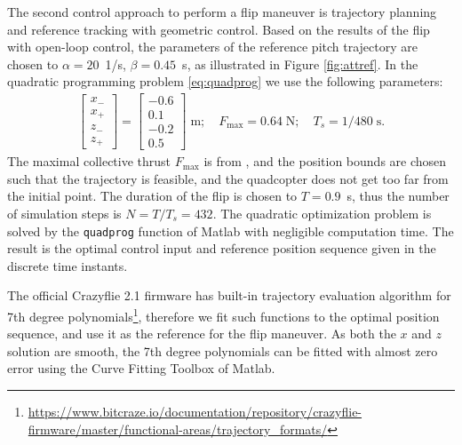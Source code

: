 The second control approach to perform a flip maneuver is trajectory planning and reference tracking with geometric control. Based on the results of the flip with open-loop control, the parameters of the reference pitch trajectory are chosen to $\alpha=20$~1/s, $\beta=0.45$~s, as illustrated in Figure \ref{fig:attref}. In the quadratic programming problem \eqref{eq:quadprog} we use the following parameters:
\begin{align*}
    \begin{bmatrix} x_- \\ x_+ \\ z_- \\ z_+ \end{bmatrix} =  \begin{bmatrix} -0.6 \\ 0.1 \\ -0.2 \\ 0.5 \end{bmatrix}\;\mathrm{m};\quad F_\mathrm{max} = 0.64\;\mathrm{N}; \quad T_s = 1/480\;\mathrm{s}.
\end{align*}
The maximal collective thrust $F_\mathrm{max}$ is from \cite{Forster}, and the position bounds are chosen such that the trajectory is feasible, and the quadcopter does not get too far from the initial point. The duration of the flip is chosen to $T=0.9$~s, thus the number of simulation steps is $N=T/T_s=432$. The quadratic optimization problem is solved by the \verb+quadprog+ function of Matlab with negligible computation time. The result is the optimal control input and reference position sequence given in the discrete time instants.

The official Crazyflie 2.1 firmware has built-in trajectory evaluation algorithm for 7th degree polynomials\footnote{\url{https://www.bitcraze.io/documentation/repository/crazyflie-firmware/master/functional-areas/trajectory_formats/}}, therefore we fit such functions to the optimal position sequence, and use it as the reference for the flip maneuver. As both the $x$ and $z$ solution are smooth, the 7th degree polynomials can be fitted with almost zero error using the Curve Fitting Toolbox of Matlab.

